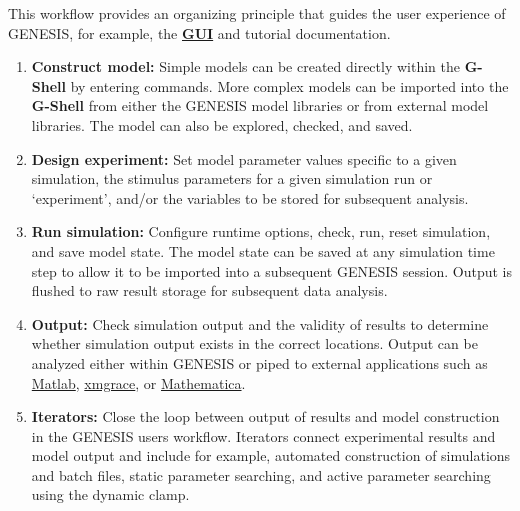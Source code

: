 \documentclass[12pt]{article}
\begin{document}
This workflow provides an organizing principle that guides the user experience of GENESIS, for example, the \href{../gui/gui.tex}{\bf GUI} and tutorial documentation.

\begin{enumerate}

\item {\bf Construct model:} Simple models can be created directly within the {\bf G-Shell} by entering commands. More complex models can be imported into the {\bf G-Shell} from either the GENESIS model libraries or from external model libraries. The model can also be explored, checked, and saved.

\item {\bf Design experiment:}  Set model parameter values specific to a given simulation, the stimulus parameters for a given simulation run or  `experiment', and/or the variables to be stored for subsequent analysis.

\item  {\bf Run simulation:} Configure runtime options, check, run, reset simulation, and save model state. The model state can be saved at any simulation time step to allow it to be imported into a subsequent GENESIS session. Output is flushed to raw result storage for subsequent data analysis. 

\item {\bf Output:}  Check simulation output and the validity of results to determine whether simulation output exists in the correct locations. Output can be analyzed either within GENESIS or piped to external applications such as \href{http://www.mathworks.com/}{Matlab}, \href{http://www.mathworks.com/}{xmgrace}, or \href{http://www.wolfram.com/}{Mathematica}.

\item {\bf Iterators:} Close the loop between output of results and model construction in the GENESIS users workflow. Iterators connect experimental results and model output and include for example, automated construction of simulations and batch files, static parameter searching, and active parameter searching using the dynamic clamp. 

\end{enumerate}
\end{document}
